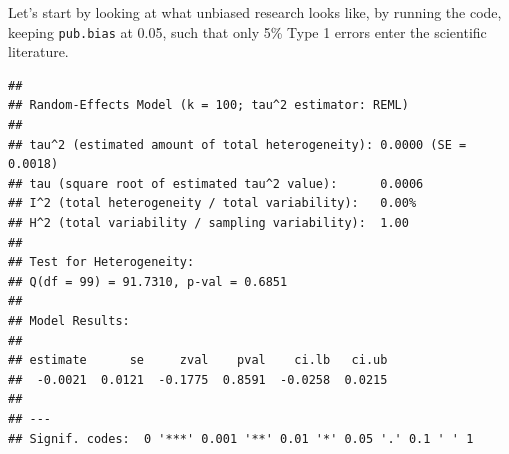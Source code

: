 \documentclass[
  oneside]{book}
\newenvironment{Shaded}{\begin{snugshade}}{\end{snugshade}}
\newcommand{\AttributeTok}[1]{\textcolor[rgb]{0.77,0.63,0.00}{#1}}
\newcommand{\CommentTok}[1]{\textcolor[rgb]{0.56,0.35,0.01}{\textit{#1}}}
\newcommand{\DecValTok}[1]{\textcolor[rgb]{0.00,0.00,0.81}{#1}}
\newcommand{\FloatTok}[1]{\textcolor[rgb]{0.00,0.00,0.81}{#1}}
\newcommand{\FunctionTok}[1]{\textcolor[rgb]{0.00,0.00,0.00}{#1}}
\newcommand{\NormalTok}[1]{#1}
\newcommand{\OtherTok}[1]{\textcolor[rgb]{0.56,0.35,0.01}{#1}}
\newcommand{\SpecialCharTok}[1]{\textcolor[rgb]{0.00,0.00,0.00}{#1}}
\newcommand{\StringTok}[1]{\textcolor[rgb]{0.31,0.60,0.02}{#1}}
\begin{document}
\begin{Shaded}
\end{Shaded}

Let's start by looking at what unbiased research looks like, by running the code, keeping \texttt{pub.bias} at 0.05, such that only 5\% Type 1 errors enter the scientific literature.

\begin{verbatim}
## 
## Random-Effects Model (k = 100; tau^2 estimator: REML)
## 
## tau^2 (estimated amount of total heterogeneity): 0.0000 (SE = 0.0018)
## tau (square root of estimated tau^2 value):      0.0006
## I^2 (total heterogeneity / total variability):   0.00%
## H^2 (total variability / sampling variability):  1.00
## 
## Test for Heterogeneity:
## Q(df = 99) = 91.7310, p-val = 0.6851
## 
## Model Results:
## 
## estimate      se     zval    pval    ci.lb   ci.ub 
##  -0.0021  0.0121  -0.1775  0.8591  -0.0258  0.0215    
## 
## ---
## Signif. codes:  0 '***' 0.001 '**' 0.01 '*' 0.05 '.' 0.1 ' ' 1
\end{verbatim}
\end{document}
